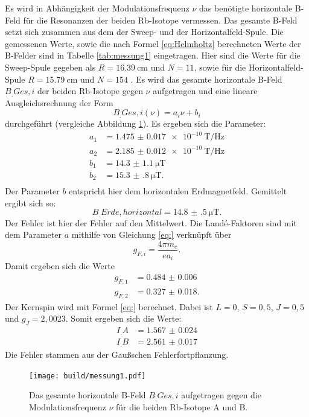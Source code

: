 Es wird in Abhängigkeit der Modulationsfrequenz $\nu$ das benötigte horizontale B-Feld für die Resonanzen der beiden Rb-Isotope vermessen. Das gesamte B-Feld setzt sich zusammen aus dem der Sweep- und der Horizontalfeld-Spule. Die gemessenen Werte, sowie die nach Formel \ref{eq:Helmholtz} berechneten Werte der B-Felder sind in Tabelle \ref{tab:messung1} eingetragen. Hier sind die Werte für die Sweep-Spule gegeben als $R=\SI{16.39}{\centi\metre}$ und $N=11$, sowie für die Horizontalfeld-Spule $R=\SI{15.79}{\centi\metre}$ und $N=154$ \cite{V21}.
Es wird das gesamte horizontale B-Feld $B_.{Ges,i}$ der beiden Rb-Isotope gegen $\nu$ aufgetragen und eine lineare Ausgleichsrechnung der Form
\[
B_.{Ges,i}(\nu) = a_i\nu + b_i
\]
durchgeführt (vergleiche Abbildung \ref{fig:messung1}).
Es ergeben sich die Parameter:
\begin{align*}
a_1 &= \SI{1.475(17)e-10}{\tesla\per\hertz}\\
a_2 &= \SI{2.185(12)e-10}{\tesla\per\hertz}\\
b_1 &= \SI{14.3(11)}{\micro\tesla}\\
b_2 &= \SI{15.3(8)}{\micro\tesla}\text{.}\\
\end{align*}
Der Parameter $b$ entspricht hier dem horizontalen Erdmagnetfeld. Gemittelt ergibt sich so:
\[
B_.{Erde,horizontal} = \SI{14.8(5)}{\micro\tesla}\text{.}
\]
Der Fehler ist hier der Fehler auf den Mittelwert.
Die Landé-Faktoren sind mit dem Parameter $a$ mithilfe von Gleichung \eqref{eq:} verknüpft über
\begin{equation*}
g_{F,i}=\frac{4\pi m_e}{e a_i} \text{.}
\end{equation*}
Damit ergeben sich die Werte
\begin{align*}
g_{F,1} &= \num{0.484(6)}\\
g_{F,2} &= \num{0.327(18)}\text{.}
\end{align*}
Der Kernspin wird mit Formel \eqref{eq:} berechnet. Dabei ist $L=0$, $S=0,5$, $J=0,5$ und $g_J=2,0023$. 
Somit ergeben sich die Werte:
\begin{align*}
I_.A &= \num{1.567(24)}\\
I_.B &= \num{2.561(17)}
\end{align*}
Die Fehler stammen aus der Gaußschen Fehlerfortpflanzung.
\begin{figure}
	\centering
	\texttt{[image: build/messung1.pdf]}
	\caption{Das gesamte horizontale B-Feld $B_.{Ges,i}$ aufgetragen gegen die Modulationsfrequenz $\nu$ für die beiden Rb-Isotope A und B.}
	\label{fig:messung1}
\end{figure}

